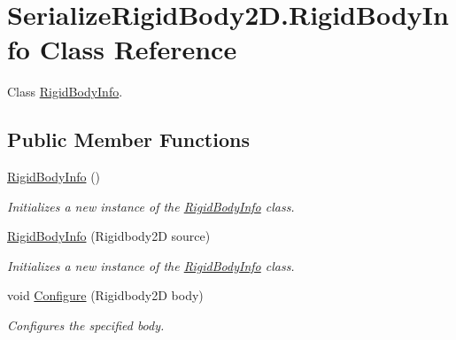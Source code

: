 \hypertarget{class_serialize_rigid_body2_d_1_1_rigid_body_info}{}\section{Serialize\+Rigid\+Body2\+D.\+Rigid\+Body\+Info Class Reference}
\label{class_serialize_rigid_body2_d_1_1_rigid_body_info}


Class \hyperlink{class_serialize_rigid_body2_d_1_1_rigid_body_info}{Rigid\+Body\+Info}.  


\subsection*{Public Member Functions}
\begin{DoxyCompactItemize}
\item 
\hyperlink{class_serialize_rigid_body2_d_1_1_rigid_body_info_aada2280a40e0cc547228b44946ff56ec}{Rigid\+Body\+Info} ()
\begin{DoxyCompactList}\small\item\em Initializes a new instance of the \hyperlink{class_serialize_rigid_body2_d_1_1_rigid_body_info}{Rigid\+Body\+Info} class. \end{DoxyCompactList}\item 
\hyperlink{class_serialize_rigid_body2_d_1_1_rigid_body_info_a29d3ba0932fd7e82ce99b3fd92d61ec2}{Rigid\+Body\+Info} (Rigidbody2D source)
\begin{DoxyCompactList}\small\item\em Initializes a new instance of the \hyperlink{class_serialize_rigid_body2_d_1_1_rigid_body_info}{Rigid\+Body\+Info} class. \end{DoxyCompactList}\item 
void \hyperlink{class_serialize_rigid_body2_d_1_1_rigid_body_info_a35d47af4c01c02171b70d5fafe6c44bc}{Configure} (Rigidbody2D body)
\begin{DoxyCompactList}\small\item\em Configures the specified body. \end{DoxyCompactList}\end{DoxyCompactItemize}
